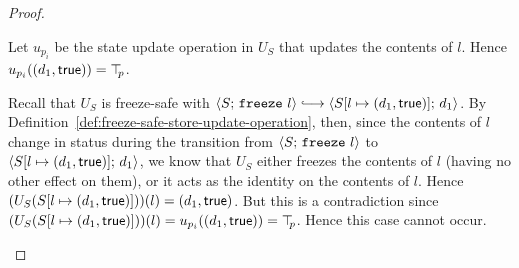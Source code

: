 \begin{proof}
\begin{itemize}
\begin{itemize}
      Let $u_{p_i}$ be the state update operation in $U_S$ that
      updates the contents of $l$.  Hence
      $u_{p_i}((d_1, \textsf{true})) = \top\hspace{-0.85mm}_{p}$.

      Recall that $U_S$ is freeze-safe with $\config{S}{\freeze{l}}
      \parstepsto \config{\extS{S}{l}{d_1}{\frozentrue}}{d_1}$.  By
      Definition~\ref{def:freeze-safe-store-update-operation}, then,
      since the contents of $l$ change in status during the transition
      from $\langle S;\, \mbox{\texttt{freeze}}~l \rangle$ to
      $\langle S[l \mapsto (d_1, \textsf{true})];\, d_1 \rangle$, we know that
      $U_S$ either freezes the contents of $l$ (having no other effect
      on them), or it acts as the identity on the contents of $l$.
      Hence $(U_S(S[l \mapsto (d_1, \textsf{true})]))(l) =
      (d_1, \textsf{true})$.  But this is a contradiction since
      $(U_S(S[l \mapsto (d_1, \textsf{true})]))(l) =
      u_{p_i}((d_1, \textsf{true})) = \top\hspace{-0.85mm}_{p}$.  Hence this case
      cannot occur.
    \end{itemize}

  \end{itemize}
\end{proof}
